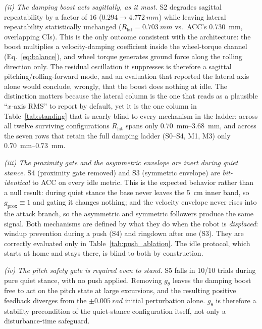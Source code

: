 \documentclass[a4paper,fleqn]{cas-dc}
\begin{document}
\emph{(ii) The damping boost acts sagittally, as it must.} S2 degrades sagittal
repeatability by a factor of \num{16} ($0.294\rightarrow\SI{4.772}{mm}$) while
leaving lateral repeatability statistically unchanged
($R_{\text{lat}}=\SI{0.703}{mm}$ vs.\ ACC's \SI{0.730}{mm}, overlapping CIs). This
is the only outcome consistent with the architecture: the boost multiplies a
velocity-damping coefficient inside the wheel-torque channel
(Eq.~\eqref{eq:balance}), and wheel torque generates ground force along the
rolling direction only. The residual oscillation it suppresses is therefore a
sagittal pitching/rolling-forward mode, and an evaluation that reported the
lateral axis alone would conclude, wrongly, that the boost does nothing at idle.
The distinction matters because the lateral column is the one that reads as a
plausible ``$x$-axis RMS'' to report by default, yet it is the one column in
Table~\ref{tab:standing} that is nearly blind to every mechanism in the ladder:
across all twelve surviving configurations $R_{\text{lat}}$ spans only
\SIrange{0.70}{3.68}{mm}, and across the seven rows that retain the full damping
ladder (S0--S4, M1, M3) only \SIrange{0.70}{0.73}{mm}.

\emph{(iii) The proximity gate and the asymmetric envelope are inert during quiet
stance.} S4 (proximity gate removed) and S3 (symmetric envelope) are
\emph{bit-identical} to ACC on every idle metric. This is the expected behavior
rather than a null result: during quiet stance the base never leaves the \SI{5}{cm}
inner band, so $g_{\text{prox}}{\equiv}1$ and gating it changes nothing; and the
velocity envelope never rises into the attack branch, so the asymmetric and symmetric
followers produce the same signal. Both mechanisms are defined by what they do when
the robot is \emph{displaced}: windup prevention during a push (S4) and ringdown after one (S3). They are correctly evaluated only in Table~\ref{tab:push_ablation}.
The idle protocol, which starts at home and stays there, is blind to both by
construction.

\emph{(iv) The pitch safety gate is required even to stand.} S5 falls in
\num{10}/\num{10} trials during pure quiet stance, with no push applied. Removing
$g_\theta$ leaves the damping boost free to act on the pitch state at large
excursions, and the resulting positive feedback diverges from the ${\pm}\SI{0.005}{rad}$
initial perturbation alone. $g_\theta$ is therefore a stability precondition of
the quiet-stance configuration itself, not only a disturbance-time safeguard.
\end{document}
